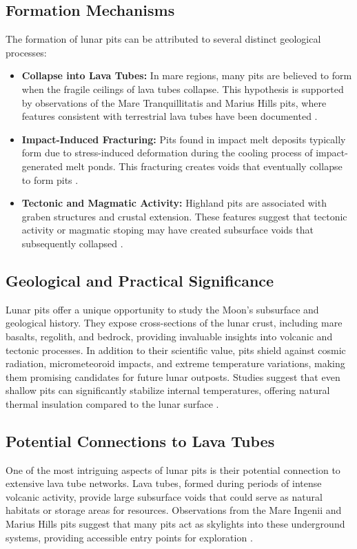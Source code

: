 \documentclass[12pt]{article}
\begin{document}
\subsection{Formation Mechanisms}
The formation of lunar pits can be attributed to several distinct geological processes:
\begin{itemize}
    \item \textbf{Collapse into Lava Tubes:} In mare regions, many pits are believed to form when the fragile ceilings of lava tubes collapse. This hypothesis is supported by observations of the Mare Tranquillitatis and Marius Hills pits, where features consistent with terrestrial lava tubes have been documented \cite{sublunear-lava, lunar-pits-entrances-to-caves}.
    \item \textbf{Impact-Induced Fracturing:} Pits found in impact melt deposits typically form due to stress-induced deformation during the cooling process of impact-generated melt ponds. This fracturing creates voids that eventually collapse to form pits \cite{lunar-pit-distribution}.
    \item \textbf{Tectonic and Magmatic Activity:} Highland pits are associated with graben structures and crustal extension. These features suggest that tectonic activity or magmatic stoping may have created subsurface voids that subsequently collapsed \cite{lunar-pit-distribution, lunar-pits-numerical-modelling}.
\end{itemize}

\subsection{Geological and Practical Significance}
Lunar pits offer a unique opportunity to study the Moon’s subsurface and geological history. They expose cross-sections of the lunar crust, including mare basalts, regolith, and bedrock, providing invaluable insights into volcanic and tectonic processes. In addition to their scientific value, pits shield against cosmic radiation, micrometeoroid impacts, and extreme temperature variations, making them promising candidates for future lunar outposts. Studies suggest that even shallow pits can significantly stabilize internal temperatures, offering natural thermal insulation compared to the lunar surface \cite{sublunear-lava, lunar-pits-entrances-to-caves}.

\subsection{Potential Connections to Lava Tubes}
One of the most intriguing aspects of lunar pits is their potential connection to extensive lava tube networks. Lava tubes, formed during periods of intense volcanic activity, provide large subsurface voids that could serve as natural habitats or storage areas for resources. Observations from the Mare Ingenii and Marius Hills pits suggest that many pits act as skylights into these underground systems, providing accessible entry points for exploration \cite{lunar-pits-entrances-to-caves, lunar-pits-numerical-modelling}.
\end{document}
